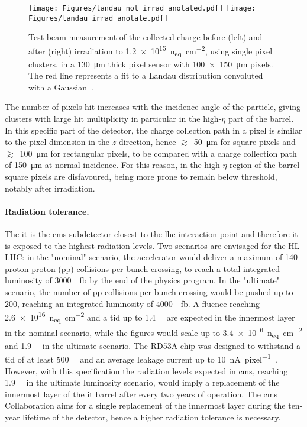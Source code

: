 \begin{figure}[!b]
    \centering
    \texttt{[image: Figures/landau\_not\_irrad\_anotated.pdf]}
    \texttt{[image: Figures/landau\_irrad\_anotate.pdf]}
    \caption{Test beam measurement of the collected charge before (left) and after (right) irradiation to \SI{1.2e15}{n_{eq}\per\centi\meter\squared}, using single pixel clusters, in a \SI{130}{\micro\meter} thick pixel sensor with \SI[product-units = power]{100x150}{\micro\meter} pixels. The red line represents a fit to a Landau distribution convoluted with a Gaussian~\cite{p2_tdr}.}
    \label{fig:mip}
\end{figure}

The number of pixels hit increases with the incidence angle of the particle, giving clusters with large hit multiplicity in particular in the high-$\eta$ part of the barrel. In this specific part of the detector, the charge collection path in a pixel is similar to the pixel dimension in the $z$ direction, hence $\gtrsim$~\SI{50}{\micro\meter} for square pixels and $\gtrsim$~\SI{100}{\micro\meter} for rectangular pixels, to be compared with a charge collection path of \SI{150}{\micro\meter} at normal incidence. For this reason, in the high-$\eta$ region of the barrel square pixels are disfavoured, being more prone to remain below threshold, notably after irradiation.


\paragraph{Radiation tolerance.}
The \gls{it} is the \gls{cms} subdetector closest to the \gls{lhc} interaction point and therefore it is exposed to the highest radiation levels. Two scenarios are envisaged for the HL-LHC: in the "nominal" scenario, the accelerator would deliver a maximum of \num{140} proton-proton (pp) collisions per bunch crossing, to reach a total integrated luminosity of \SI{3000}{\per\femto\barn} by the end of the physics program. In the "ultimate" scenario, the number of pp collisions per bunch crossing would be pushed up to 200, reaching an integrated luminosity of \SI{4000}{\per\femto\barn}.
A fluence reaching \SI{2.6e16}{n_{eq}\per\centi\meter\squared} and a \gls{tid} up to \SI{1.4}{\giga\rad} are expected in the innermost layer in the nominal scenario, while the figures would scale up to \SI{3.4e16}{n_{eq}\per\centi\meter\squared} and \SI{1.9}{\giga\rad} in the ultimate scenario.
The RD53A chip was designed to withstand a \gls{tid} of at least \SI{500}{\mega\rad} and an average leakage current up to \SI{10}{\nano\ampere\per pixel}~\citep{rd53a_specs}. However, with this specification the radiation levels expected in \gls{cms}, reaching \SI{1.9}{\giga\rad} in the ultimate luminosity scenario, would imply a replacement of the innermost layer of the \gls{it} barrel after every two years of operation. The \gls{cms} Collaboration aims for a single replacement of the innermost layer during the ten-year lifetime of the detector, hence a higher radiation tolerance is necessary.

